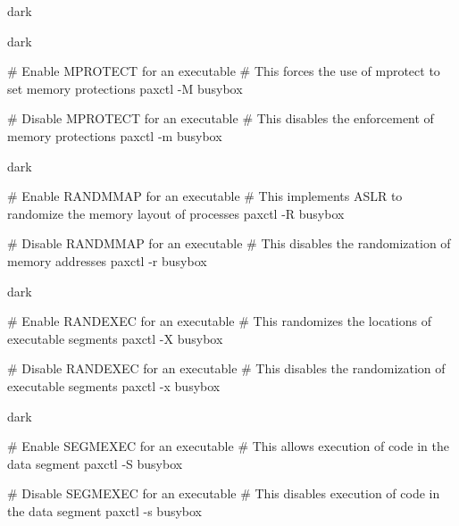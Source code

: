 \begin{baseBoxThree}{}{dark}
    \label{MPROTECT}
    \begin{baseBoxThree}{}{dark}
        \begin{posnex}
# Enable MPROTECT for an executable
# This forces the use of mprotect to set memory protections
paxctl -M busybox

# Disable MPROTECT for an executable
# This disables the enforcement of memory protections
paxctl -m busybox
        \end{posnex}
    \end{baseBoxThree}
    \smallskip
    \label{RANDMMAP}
    \begin{baseBoxThree}{}{dark}
        \begin{posnex}
# Enable RANDMMAP for an executable
# This implements ASLR to randomize the memory layout of processes
paxctl -R busybox

# Disable RANDMMAP for an executable
# This disables the randomization of memory addresses
paxctl -r busybox
        \end{posnex}
    \end{baseBoxThree}
    \smallskip
    \label{RANDEXEC}
    \begin{baseBoxThree}{}{dark}
        \begin{posnex}
    # Enable RANDEXEC for an executable
    # This randomizes the locations of executable segments
    paxctl -X busybox
    
    # Disable RANDEXEC for an executable
    # This disables the randomization of executable segments
    paxctl -x busybox
        \end{posnex}
    \end{baseBoxThree}
    \smallskip
    \label{SEGMEXEC}
    \begin{baseBoxThree}{}{dark}
        \begin{posnex}
    # Enable SEGMEXEC for an executable
    # This allows execution of code in the data segment
    paxctl -S busybox
    
    # Disable SEGMEXEC for an executable
    # This disables execution of code in the data segment
    paxctl -s busybox        
        \end{posnex}
    \end{baseBoxThree}
    \smallskip
\end{baseBoxThree}


